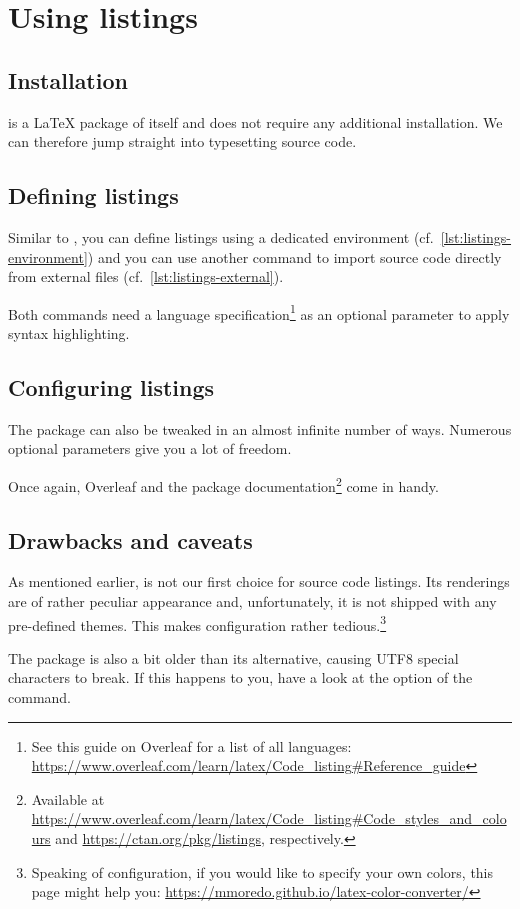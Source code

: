 \section{Using listings}

\subsection{Installation}
 is a \LaTeX{} package of itself and does not require any additional installation.
We can therefore jump straight into typesetting source code.

\subsection{Defining listings}
Similar to , you can define listings using a dedicated environment (cf.\ \cref{lst:listings-environment}) and you can use another command to import source code directly from external files (cf.\ \cref{lst:listings-external}).


\noindent Both commands need a language specification\footnote{See this guide on Overleaf for a list of all languages: \url{https://www.overleaf.com/learn/latex/Code_listing\#Reference_guide}} as an optional parameter to apply syntax highlighting.

\subsection{Configuring listings}
The  package can also be tweaked in an almost infinite number of ways.
Numerous optional parameters give you a lot of freedom.

Once again, Overleaf and the package documentation\footnote{Available at \url{https://www.overleaf.com/learn/latex/Code_listing\#Code_styles_and_colours} and \url{https://ctan.org/pkg/listings}, respectively.} come in handy.


\subsection{Drawbacks and caveats}
As mentioned earlier,  is not our first choice for source code listings.
Its renderings are of rather peculiar appearance and, unfortunately, it is not shipped with any pre-defined themes.
This makes configuration rather tedious.\footnote{Speaking of configuration, if you would like to specify your own colors, this page might help you: \url{https://mmoredo.github.io/latex-color-converter/}}

The package is also a bit older than its alternative, causing UTF8 special characters to break. 
If this happens to you, have a look at the  option of the  command.
